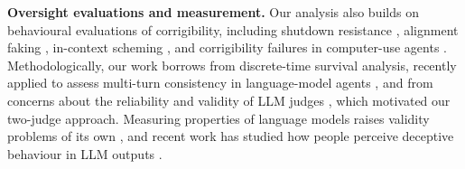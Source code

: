 \textbf{Oversight evaluations and measurement.}
Our analysis also builds on behavioural evaluations of corrigibility, including shutdown resistance \citep{schlatter2025shutdown}, alignment faking \citep{greenblatt2024alignmentfaking}, in-context scheming \citep{meinke2024scheming}, and corrigibility failures in computer-use agents \citep{tien2026rogue}. Methodologically, our work borrows from discrete-time survival analysis, recently applied to assess multi-turn consistency in language-model agents \citep{bogdanov2026survival}, and from concerns about the reliability and validity of LLM judges \citep{norman2026reliability,mukherjee2026geometry,zheng2023judging}, which motivated our two-judge approach. Measuring properties of language models raises validity problems of its own \citep{vanderwal2024biases}, and recent work has studied how people perceive deceptive behaviour in LLM outputs \citep{zhan2025banal}.

